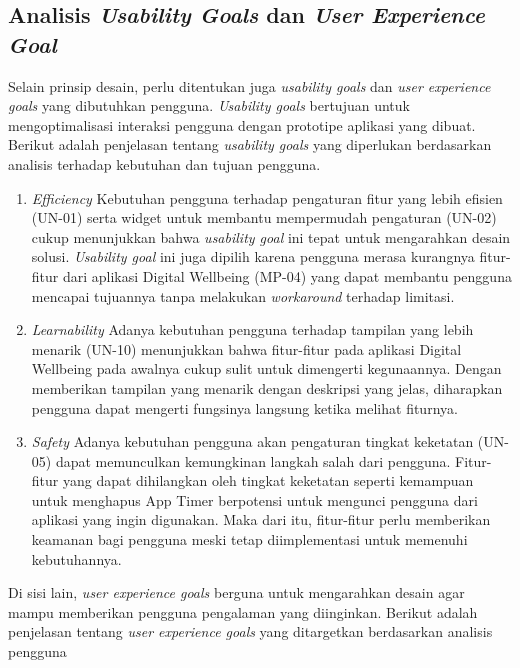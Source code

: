 \subsection{Analisis \textit{Usability Goals} dan \textit{User Experience Goal}}

Selain prinsip desain, perlu ditentukan juga \textit{usability goals} dan \textit{user experience goals} yang dibutuhkan pengguna. \textit{Usability goals} bertujuan untuk mengoptimalisasi interaksi pengguna dengan prototipe aplikasi yang dibuat. Berikut adalah penjelasan tentang \textit{usability goals} yang diperlukan berdasarkan analisis terhadap kebutuhan dan tujuan pengguna.

\begin{enumerate}
  \item \textit{Efficiency}
  \subitem Kebutuhan pengguna terhadap pengaturan fitur yang lebih efisien (UN-01) serta widget untuk membantu mempermudah pengaturan (UN-02) cukup menunjukkan bahwa \textit{usability goal} ini tepat untuk mengarahkan desain solusi. \textit{Usability goal} ini juga dipilih karena pengguna merasa kurangnya fitur-fitur dari aplikasi Digital Wellbeing (MP-04) yang dapat membantu pengguna mencapai tujuannya tanpa melakukan \textit{workaround} terhadap limitasi.

  \item \textit{Learnability}
  \subitem Adanya kebutuhan pengguna terhadap tampilan yang lebih menarik (UN-10) menunjukkan bahwa fitur-fitur pada aplikasi Digital Wellbeing pada awalnya cukup sulit untuk dimengerti kegunaannya. Dengan memberikan tampilan yang menarik dengan deskripsi yang jelas, diharapkan pengguna dapat mengerti fungsinya langsung ketika melihat fiturnya.
  
  \item \textit{Safety}
  \subitem Adanya kebutuhan pengguna akan pengaturan tingkat keketatan (UN-05) dapat memunculkan kemungkinan langkah salah dari pengguna. Fitur-fitur yang dapat dihilangkan oleh tingkat keketatan seperti kemampuan untuk menghapus App Timer berpotensi untuk mengunci pengguna dari aplikasi yang ingin digunakan. Maka dari itu, fitur-fitur perlu memberikan keamanan bagi pengguna meski tetap diimplementasi untuk memenuhi kebutuhannya.

\end{enumerate}

Di sisi lain, \textit{user experience goals} berguna untuk mengarahkan desain agar mampu memberikan pengguna pengalaman yang diinginkan. Berikut adalah penjelasan tentang \textit{user experience goals} yang ditargetkan berdasarkan analisis pengguna

